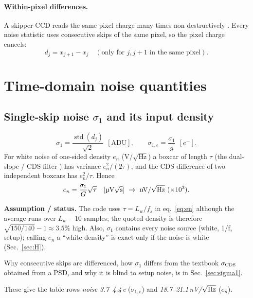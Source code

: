 \documentclass[10pt,a4paper]{article}
\newcommand{\std}{\operatorname{std}}
\newcommand{\caveat}[1]{\par\smallskip\noindent\colorbox{orange!10}{\parbox{\dimexpr\linewidth-2\fboxsep}{\small\textbf{Assumption / status.} #1}}\par\smallskip}
\begin{document}
\paragraph{Within-pixel differences.} A skipper CCD reads the same pixel charge many times non-destructively
\cite{janesick1990,chandler1990,tiffenberg2017,moroni2012}. Every noise statistic uses consecutive skips of the same
pixel, so the pixel charge cancels:
\begin{equation}
d_j=x_{j+1}-x_j\quad(\text{only for } j,j+1 \text{ in the same pixel}).
\end{equation}

\section{Time-domain noise quantities}

\subsection{Single-skip noise $\sigma_1$ and its input density}
\begin{equation}
\sigma_1=\frac{\std(d_j)}{\sqrt2}\ \ [\text{ADU}],\qquad
\sigma_{1,e}=\frac{\sigma_1}{g}\ \ [e^-].
\end{equation}
For white noise of one-sided density $e_n$ (V/$\sqrt{\text{Hz}}$) a boxcar of length $\tau$ (the dual-slope / CDS
filter \cite{hopkinson1982}) has variance
$e_n^2/(2\tau)$, and the CDS difference of two independent boxcars has $e_n^2/\tau$. Hence
\begin{equation}
e_n=\frac{\sigma_1}{G}\sqrt{\tau}\quad[\text{\textmu V}\sqrt{\text s}]\ \to\ \text{nV}/\sqrt{\text{Hz}}\ (\times10^3).
\label{eq:en}
\end{equation}
\caveat{The code uses $\tau=L_w/f_s$ in eq.~\eqref{eq:en} although the average runs over $L_w-10$ samples; the
quoted density is therefore $\sqrt{150/140}-1\approx3.5\%$ high. Also, $\sigma_1$ contains every noise source (white,
1/f, setup); calling $e_n$ a ``white density'' is exact only if the noise is white (Sec.~\ref{sec:H}).}

Why consecutive skips are differenced, how $\sigma_1$ differs from the textbook $\sigma_{\rm CDS}$ obtained
from a PSD, and why it is blind to setup noise, is in Sec.~\ref{sec:sigma1}.

These give the table rows \emph{noise 3.7--4.4\,e} ($\sigma_{1,e}$) and \emph{18.7--21.1\,nV/$\sqrt{\rm Hz}$}
($e_n$).
\end{document}

